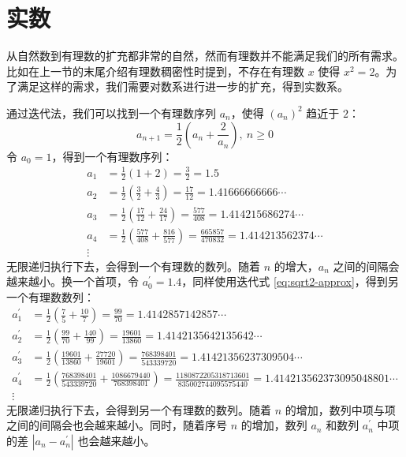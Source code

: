 \section{实数}

从自然数到有理数的扩充都非常的自然，然而有理数并不能满足我们的所有需求。比如在上一节的末尾介绍有理数稠密性时提到，不存在有理数 $x$ 使得 $x^2=2$。为了满足这样的需求，我们需要对数系进行进一步的扩充，得到实数系。
\vspace{1em}

\begin{example}
    通过迭代法，我们可以找到一个有理数序列 $a_n$，使得 $(a_n)^2$ 趋近于 $2$：
    \begin{equation}
        a_{n+1} = \frac{1}{2}(a_n+\frac{2}{a_n}),\ n\ge 0
        \label{eq:sqrt2-approx}
    \end{equation}
    令 $a_0=1$，得到一个有理数序列：
    \begin{align*}
        a_1 &= \frac{1}{2}(1+2) = \frac{3}{2} = 1.5\\
        a_2 &= \frac{1}{2}(\frac{3}{2}+\frac{4}{3})=\frac{17}{12} = 1.41666666666\cdots\\
        a_3 &= \frac{1}{2}(\frac{17}{12}+\frac{24}{17})=\frac{577}{408}= 1.414215686274\cdots\\
        a_4 &= \frac{1}{2}(\frac{577}{408}+\frac{816}{577})=\frac{665857}{470832}=1.414213562374\cdots\\
        \vdots
    \end{align*}
    无限递归执行下去，会得到一个有理数的数列。随着 $n$ 的增大，$a_n$ 之间的间隔会越来越小。换一个首项，令 $a^{\prime}_0=1.4$，同样使用迭代式 \ref{eq:sqrt2-approx}，得到另一个有理数数列：
    \begin{align*}
        a_1^{\prime} &= \frac{1}{2}(\frac{7}{5}+\frac{10}{7}) = \frac{99}{70} = 1.4142857142857\cdots\\
        a_2^{\prime} &= \frac{1}{2}(\frac{99}{70}+\frac{140}{99})=\frac{19601}{13860}=1.4142135642135642\cdots\\
        a_3^{\prime} &= \frac{1}{2}(\frac{19601}{13860}+\frac{27720}{19601})=\frac{768398401}{543339720}=1.41421356237309504\cdots\\
        a_4^{\prime} &=\frac{1}{2}(\frac{768398401}{543339720}+\frac{1086679440}{768398401})=\frac{1180872205318713601}{835002744095575440}=1.414213562373095048801\cdots\\
        \vdots
    \end{align*}
    无限递归执行下去，会得到另一个有理数的数列。随着 $ n $ 的增加，数列中项与项之间的间隔会也会越来越小。同时，随着序号 $ n $ 的增加，数列 $ a_n $ 和数列 $ a_n^{\prime} $ 中项的差 $ |a_n-a_n^{\prime}| $ 也会越来越小。
    \label{ex:sqrt2-approx}
\end{example}

